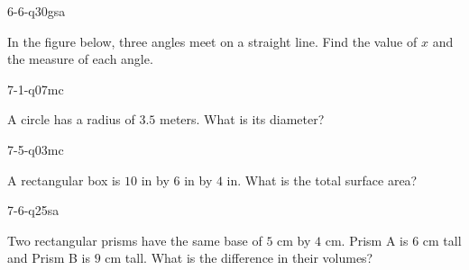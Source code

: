 \begin{practiceQuestion}{6-6-q30}{gsa}
\begin{questionText}
In the figure below, three angles meet on a straight line. Find the value of $x$ and the measure of each angle.

\begin{center}
\end{center}
\end{questionText}
\end{practiceQuestion}

\begin{practiceQuestion}{7-1-q07}{mc}
\begin{questionText}
A circle has a radius of $3.5$ meters. What is its diameter?
\end{questionText}
\end{practiceQuestion}

\begin{practiceQuestion}{7-5-q03}{mc}
\begin{questionText}
A rectangular box is $10$ in by $6$ in by $4$ in. What is the total surface area?
\end{questionText}
\end{practiceQuestion}

\begin{practiceQuestion}{7-6-q25}{sa}
\begin{questionText}
Two rectangular prisms have the same base of $5$ cm by $4$ cm. Prism A is $6$ cm tall and Prism B is $9$ cm tall. What is the difference in their volumes?
\end{questionText}
\end{practiceQuestion}

